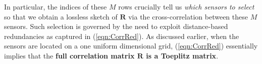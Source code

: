 %
In particular, the indices of these $M$ rows crucially tell us {\em which sensors to select} so that we  obtain a lossless sketch of $\mathbf{R}$ via  the cross-correlation between these $M$ sensors. Such selection is governed by the need to exploit distance-based redundancies as captured in (\ref{eqn:CorrRed}). As discussed earlier, when the sensors are located on a one uniform dimensional grid, (\ref{eqn:CorrRed}) essentially implies that the {\bf full correlation matrix $\mathbf{R}$ is a Toeplitz matrix}. %
